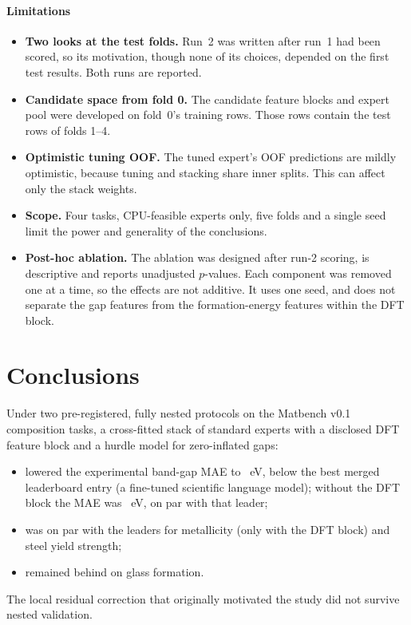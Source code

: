 \paragraph{Limitations}
\begin{itemize}
\item \textbf{Two looks at the test folds.} Run~2 was written after run~1 had been scored, so its motivation, though none of its choices, depended on the first test results. Both runs are reported.
\item \textbf{Candidate space from fold 0.} The candidate feature blocks and expert pool were developed on fold~0's training rows. Those rows contain the test rows of folds 1--4.
\item \textbf{Optimistic tuning OOF.} The tuned expert's OOF predictions are mildly optimistic, because tuning and stacking share inner splits. This can affect only the stack weights.
\item \textbf{Scope.} Four tasks, CPU-feasible experts only, five folds and a single seed limit the power and generality of the conclusions.
\item \textbf{Post-hoc ablation.} The ablation was designed after run-2 scoring, is descriptive and reports unadjusted $p$-values. Each component was removed one at a time, so the effects are not additive. It uses one seed, and does not separate the gap features from the formation-energy features within the DFT block.
\end{itemize}

\section{Conclusions}
\label{sec:conclusions}
Under two pre-registered, fully nested protocols on the Matbench v0.1 composition tasks, a cross-fitted stack of standard experts with a disclosed DFT feature block and a hurdle model for zero-inflated gaps:
\begin{itemize}
\item lowered the experimental band-gap MAE to \AtwoFinalGap~eV, below the best merged leaderboard entry (a fine-tuned scientific language model); without the DFT block the MAE was \AblNoDftGap~eV, on par with that leader;
\item was on par with the leaders for metallicity (only with the DFT block) and steel yield strength;
\item remained behind on glass formation.
\end{itemize}
The local residual correction that originally motivated the study did not survive nested validation.
